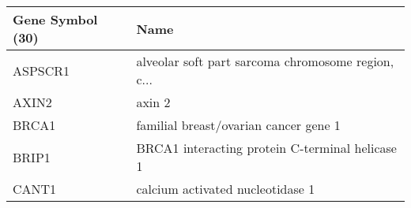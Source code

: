 \begin{tabular}{ll}
\toprule
Gene Symbol (30) &                                               Name \\
\midrule
         ASPSCR1 & alveolar soft part sarcoma chromosome region, c... \\
           AXIN2 &                                             axin 2 \\
           BRCA1 &              familial breast/ovarian cancer gene 1 \\
           BRIP1 &    BRCA1 interacting protein C-terminal helicase 1 \\
           CANT1 &                   calcium activated nucleotidase 1 \\
\bottomrule
\end{tabular}
